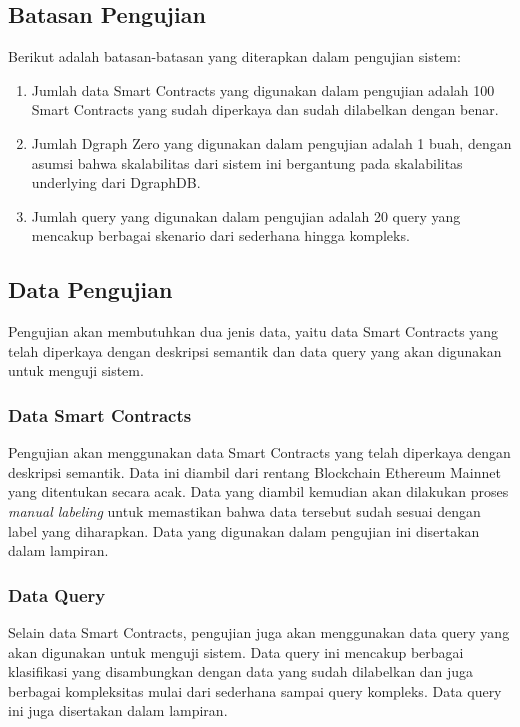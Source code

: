 \subsection{Batasan Pengujian}

Berikut adalah batasan-batasan yang diterapkan dalam pengujian sistem:
\begin{enumerate}
	\item Jumlah data Smart Contracts yang digunakan dalam pengujian adalah 100 Smart Contracts yang sudah diperkaya dan sudah dilabelkan dengan benar.
	\item Jumlah Dgraph Zero yang digunakan dalam pengujian adalah 1 buah, dengan asumsi bahwa skalabilitas dari sistem ini bergantung pada skalabilitas underlying dari DgraphDB.
	\item Jumlah query yang digunakan dalam pengujian adalah 20 query yang mencakup berbagai skenario dari sederhana hingga kompleks.
\end{enumerate}


\subsection{Data Pengujian}

Pengujian akan membutuhkan dua jenis data, yaitu data Smart Contracts yang telah diperkaya dengan deskripsi semantik dan data query yang akan digunakan untuk menguji sistem.

\subsubsection{Data Smart Contracts}

Pengujian akan menggunakan data Smart Contracts yang telah diperkaya dengan deskripsi semantik. Data ini diambil dari rentang Blockchain Ethereum Mainnet yang ditentukan secara acak. Data yang diambil kemudian akan dilakukan proses \textit{manual labeling} untuk memastikan bahwa data tersebut sudah sesuai dengan label yang diharapkan. Data yang digunakan dalam pengujian ini disertakan dalam lampiran.

\subsubsection{Data Query}

Selain data Smart Contracts, pengujian juga akan menggunakan data query yang akan digunakan untuk menguji sistem. Data query ini mencakup berbagai klasifikasi yang disambungkan dengan data yang sudah dilabelkan dan juga berbagai kompleksitas mulai dari sederhana sampai query kompleks. Data query ini juga disertakan dalam lampiran.


